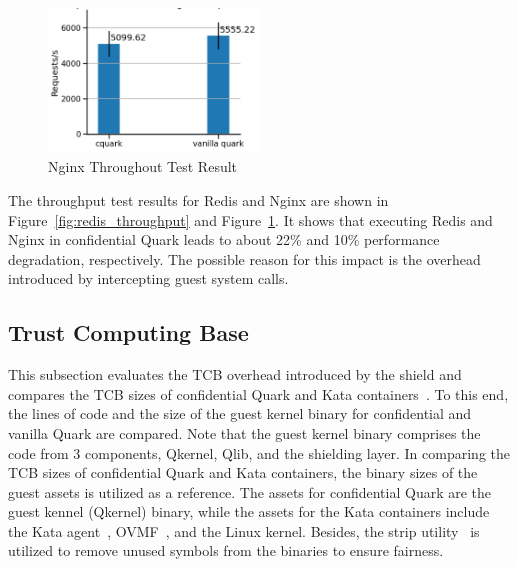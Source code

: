 \begin{figure}[!htb]
  \centering
  \includegraphics[width=0.5\textwidth]{images/nginx_throughput.PNG}
  \caption[Nginx Throughout Test]{Nginx Throughout Test Result}
  \label{fig:nginx_throughput}
\end{figure}

The throughput test results for Redis and Nginx are shown in Figure~\ref{fig:redis_throughput} and Figure~\ref{fig:nginx_throughput}. It shows that executing Redis and Nginx in confidential Quark leads to about 22\% and 10\% performance degradation, respectively. 
The possible reason for this impact is the overhead introduced by intercepting guest system calls.


\subsection{Trust Computing Base}\label{tcb}

This subsection evaluates the \acrshort{TCB} overhead introduced by the shield and compares the \acrshort{TCB}  sizes of confidential Quark and Kata containers~\cite*{Kata-Containers}. To this end, the lines of code and the size of the guest kernel binary for confidential and 
vanilla Quark are compared. Note that the guest kernel binary comprises the code from 3 components, Qkernel, Qlib, and the shielding layer. In comparing the \acrshort{TCB} sizes of confidential Quark and Kata containers, the binary sizes of the guest assets is utilized as a reference. The assets for 
confidential Quark are the guest kennel (Qkernel) binary, while the assets for the Kata containers include the Kata agent~\cite*{kata_agent}, OVMF~\cite*{ovmf}, and the Linux kernel. Besides, the strip utility~\cite*{strip} is utilized to remove unused symbols from the binaries to ensure fairness.

